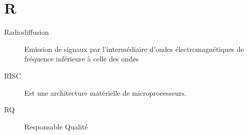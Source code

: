 \section{R}

\begin{description}

\item[Radiodiffusion] Emission de signaux par l'intermédiaire d'ondes 
électromagnétiques de fréquence inférieure à celle des ondes 

\item[RISC] Est une architecture matérielle de microprocesseurs.

\item[RQ] Responsable Qualité

\end{description}
